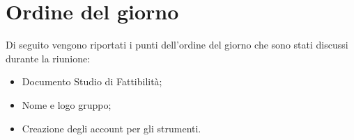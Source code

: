 \clearpage
\section{Ordine del giorno}
Di seguito vengono riportati i punti dell’ordine del giorno che sono stati discussi durante la riunione:
\begin{itemize}
	\item Documento Studio di Fattibilità;
	\item Nome e logo gruppo;
	\item Creazione degli account per gli strumenti.
\end{itemize}